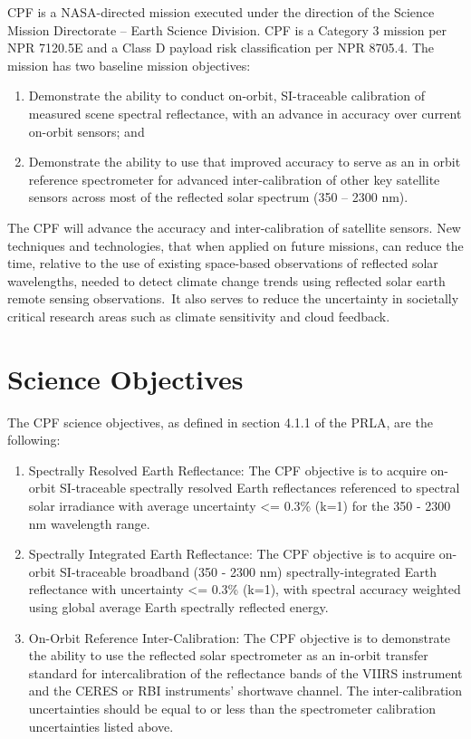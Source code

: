 \gls{CPF} is a NASA-directed mission executed under the direction of the Science Mission Directorate – Earth Science Division. \gls{CPF} is a Category 3 mission per NPR 7120.5E and a Class D payload risk classification per NPR 8705.4. The mission has two baseline mission objectives:

\begin{enumerate}
\item{} Demonstrate the ability to conduct on-orbit, \gls{SI}-traceable calibration of \gls{measure}d scene spectral reflectance, with an advance in accuracy over current on-orbit sensors; and

\item{} Demonstrate the ability to use that improved accuracy to serve as an in orbit reference spectrometer for advanced inter-calibration of other key satellite sensors across most of the reflected solar spectrum (350 – 2300 nm).

\end{enumerate}

The \gls{CPF} will advance the accuracy and inter-calibration of satellite sensors. New techniques and technologies, that when applied on future missions, can reduce the time, relative to the use of existing space-based observations of reflected solar wavelengths, needed to detect climate change trends using reflected solar earth remote sensing observations. It also serves to reduce the uncertainty in societally critical research areas such as climate sensitivity and cloud feedback.

\section{Science Objectives }
\label{scienceobjectives}

The \gls{CPF} science objectives, as defined in section 4.1.1 of the PRLA, are the following:

\begin{enumerate}
\item{} Spectrally Resolved Earth Reflectance: The \gls{CPF} objective is to acquire on-orbit \gls{SI}-traceable spectrally resolved Earth reflectances referenced to spectral solar irradiance with average uncertainty <= 0.3\% (k=1) for the 350 - 2300 nm wavelength range.

\item{} Spectrally Integrated Earth Reflectance: The \gls{CPF} objective is to acquire on-orbit \gls{SI}-traceable broadband (350 - 2300 nm) spectrally-integrated Earth reflectance with uncertainty <= 0.3\% (k=1), with spectral accuracy weighted using global average Earth spectrally reflected energy.

\item{} On-Orbit Reference Inter-Calibration: The \gls{CPF} objective is to demonstrate the ability to use the reflected solar spectrometer as an in-orbit transfer standard for intercalibration of the reflectance bands of the \gls{VIIRS} instrument and the \gls{CERES} or \gls{RBI} instruments' shortwave channel. The inter-calibration uncertainties should be equal to or less than the spectrometer calibration uncertainties listed above.

\end{enumerate}

